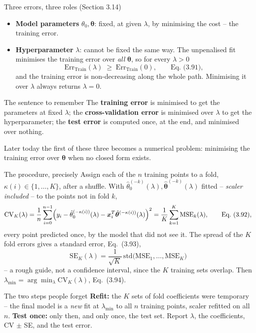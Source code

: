 \documentclass[10pt,aspectratio=169]{beamer}
\begin{document}
\begin{frame}{Three errors, three roles (Section 3.14)}
\begin{itemize}
  \item \textbf{Model parameters} $\theta_0,\bm{\theta}$: fixed, at given
        $\lambda$, by minimising the cost -- the training error.
  \item \textbf{Hyperparameter} $\lambda$: cannot be fixed the same way.  The
        unpenalised fit minimises the training error over \emph{all}
        $\bm{\theta}$, so for every $\lambda>0$
        \[
          \mathrm{Err}_{\mathrm{Train}}(\lambda)\;\ge\;\mathrm{Err}_{\mathrm{Train}}(0),
          \qquad\text{Eq.~(3.91)},
        \]
        and the training error is non-decreasing along the whole path.
        Minimising it over $\lambda$ always returns $\lambda=0$.
\end{itemize}
\vspace{2pt}
\begin{block}{The sentence to remember}
The \textbf{training error} is minimised to get the parameters at fixed
$\lambda$; the \textbf{cross-validation error} is minimised over $\lambda$
to get the hyperparameter; the \textbf{test error} is computed once, at the
end, and minimised over nothing.
\end{block}
\vspace{2pt}
Later today the first of these three becomes a numerical problem: minimising
the training error over $\bm{\theta}$ when no closed form exists.
\end{frame}

\begin{frame}{The procedure, precisely}
Assign each of the $n$ training points to a fold, $\kappa(i)\in\{1,\dots,K\}$,
after a shuffle.  With $\hat{\theta}_0^{(-k)}(\lambda),\hat{\bm{\theta}}^{(-k)}(\lambda)$
fitted -- \emph{scaler included} -- to the points not in fold $k$,
\[
  \mathrm{CV}_K(\lambda)
   = \frac{1}{n}\sum_{i=0}^{n-1}
     \Bigl(y_i-\hat{\theta}_0^{(-\kappa(i))}(\lambda)
       -\bm{x}_i^T\hat{\bm{\theta}}^{(-\kappa(i))}(\lambda)\Bigr)^2
   = \frac{1}{K}\sum_{k=1}^{K}\mathrm{MSE}_k(\lambda),
  \qquad\text{Eq.~(3.92)},
\]
every point predicted once, by the model that did not see it.  The spread of
the $K$ fold errors gives a standard error, Eq.~(3.93),
\[
  \mathrm{SE}_K(\lambda)=\frac{1}{\sqrt{K}}\,\mathrm{std}\bigl(\mathrm{MSE}_1,\dots,\mathrm{MSE}_K\bigr)
\]
-- a rough guide, not a confidence interval, since the $K$ training sets
overlap.  Then $\lambda_{\min}=\arg\min_\lambda\mathrm{CV}_K(\lambda)$,
Eq.~(3.94).
\vspace{2pt}
\begin{block}{The two steps people forget}
\textbf{Refit:} the $K$ sets of fold coefficients were temporary -- the final
model is a \emph{new} fit at $\lambda_{\min}$ to all $n$ training points,
scaler refitted on all $n$.  \textbf{Test once:} only then, and only once, the
test set.  Report $\lambda$, the coefficients, CV $\pm$ SE, and the test error.
\end{block}
\end{frame}
\end{document}
